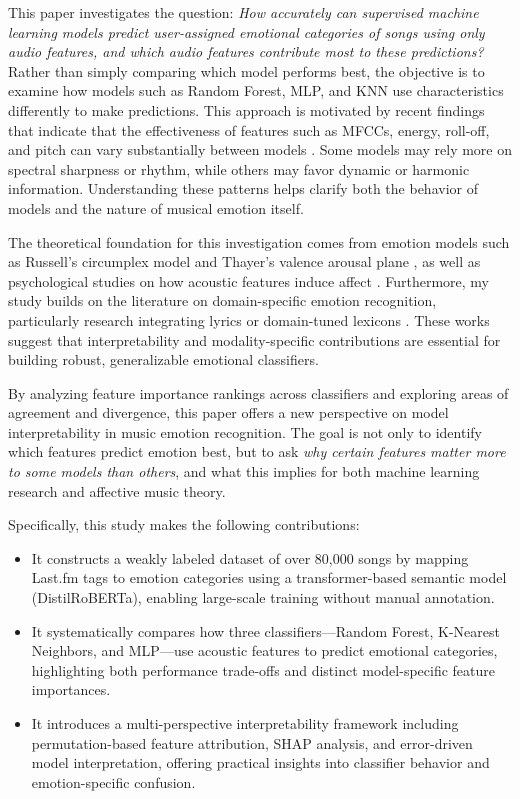 \documentclass{article}
\begin{document}
This paper investigates the question: \textit{How accurately can supervised machine learning models predict user-assigned emotional categories of songs using only audio features, and which audio features contribute most to these predictions?} Rather than simply comparing which model performs best, the objective is to examine how models such as Random Forest, MLP, and KNN use characteristics differently to make predictions. This approach is motivated by recent findings that indicate that the effectiveness of features such as MFCCs, energy, roll-off, and pitch can vary substantially between models \parencite{Juthi2020, Rosner2018, Garg2022}. Some models may rely more on spectral sharpness or rhythm, while others may favor dynamic or harmonic information. Understanding these patterns helps clarify both the behavior of models and the nature of musical emotion itself.

The theoretical foundation for this investigation comes from emotion models such as Russell's circumplex model and Thayer's valence arousal plane \parencite{Helmholz2019}, as well as psychological studies on how acoustic features induce affect \parencite{McCraty1998, Leubner2017}. Furthermore, my study builds on the literature on domain-specific emotion recognition, particularly research integrating lyrics or domain-tuned lexicons \parencite{Bandhakavi2017, Xu2011}. These works suggest that interpretability and modality-specific contributions are essential for building robust, generalizable emotional classifiers.

By analyzing feature importance rankings across classifiers and exploring areas of agreement and divergence, this paper offers a new perspective on model interpretability in music emotion recognition. The goal is not only to identify which features predict emotion best, but to ask \textit{why certain features matter more to some models than others}, and what this implies for both machine learning research and affective music theory.

Specifically, this study makes the following contributions:

\begin{itemize}
    \item It constructs a weakly labeled dataset of over 80,000 songs by mapping Last.fm tags to emotion categories using a transformer-based semantic model (DistilRoBERTa), enabling large-scale training without manual annotation.
    \item It systematically compares how three classifiers—Random Forest, K-Nearest Neighbors, and MLP—use acoustic features to predict emotional categories, highlighting both performance trade-offs and distinct model-specific feature importances.
    \item It introduces a multi-perspective interpretability framework including permutation-based feature attribution, SHAP analysis, and error-driven model interpretation, offering practical insights into classifier behavior and emotion-specific confusion.
\end{itemize}
\end{document}
